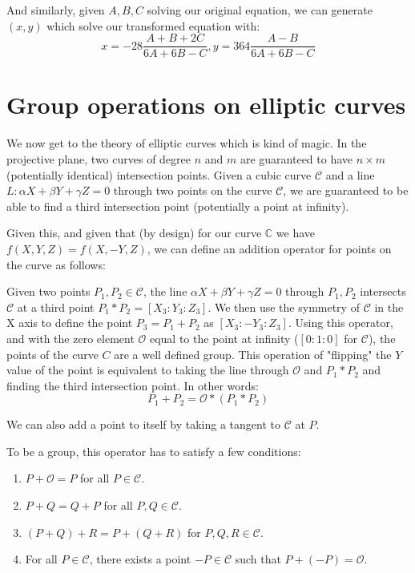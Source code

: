\documentclass{article}
\begin{document}
And similarly, given $A, B, C$ solving our original equation, we  can generate $(x,y)$ which solve our transformed
equation with:
\[ x = -28\frac{A + B + 2C}{6A + 6B - C}, y = 364\frac{A - B}{6A + 6B - C} \]

\section{Group operations on elliptic curves}

We now get to the theory of elliptic curves which is kind of magic. In the projective plane, two curves of 
degree $n$ and $m$ are guaranteed to have $n\times m$ (potentially identical) intersection points. Given a
cubic curve $\mathcal{C}$ and a line $L: \alpha X + \beta Y + \gamma Z = 0$ through two points on the curve
$\mathcal{C}$, we are guaranteed to be able to find a third intersection point (potentially a point at
infinity).

Given this, and given that (by design) for our curve $\mathbb{C}$ we have $f(X,Y,Z) = f(X,-Y,Z)$, we can
define an addition operator for points on the curve as follows:

Given two points $P_1, P_2 \in \mathcal{C}$, the line $\alpha X + \beta Y + \gamma Z = 0$ through $P_1, P_2$
intersects $\mathcal{C}$ at a third point $P_1*P_2 = [X_3:Y_3:Z_3]$. We then use the symmetry of $\mathcal{C}$
in the X axis to define the point $P_3 = P_1 + P_2$ as $[X_3:-Y_3:Z_3]$. Using this operator, and with the zero
element $\mathcal{O}$ equal to the point at infinity ($[0:1:0]$ for $\mathcal{C}$), the points of the curve $C$
are a well defined group. This operation of "flipping" the $Y$ value of the point is equivalent to taking the
line through $\mathcal{O}$ and $P_1*P_2$ and finding the third intersection point. In other words:
\[ P_1 + P_2 = \mathcal{O}*(P_1*P_2) \]

We can also add a point to itself by taking a tangent to $\mathcal{C}$ at $P$.

To be a group, this operator has to satisfy a few conditions:
\begin{enumerate}
	\item $P + \mathcal{O} = P$ for all $P \in \mathcal{C}$.
	\item $P + Q = Q + P$ for all $P, Q \in \mathcal{C}$.
	\item $(P + Q) + R = P + (Q + R)$ for $P,Q,R \in \mathcal{C}$.
	\item For all $P \in \mathcal{C}$, there exists a point $-P \in \mathcal{C}$ such that $P+(-P) = \mathcal{O}$.
\end{enumerate}
\end{document}
